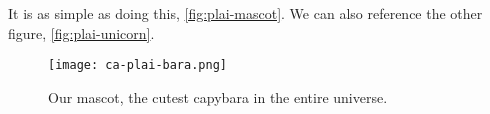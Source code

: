 It is as simple as doing this, \autoref{fig:plai-mascot}.
We can also reference the other figure, \autoref{fig:plai-unicorn}.


\begin{figure}[t]
    \begin{center}
        \texttt{[image: ca-plai-bara.png]}
    \end{center}
    \caption{Our mascot, the cutest capybara in the entire universe.}
    \label{fig:plai-mascot}
\end{figure}

